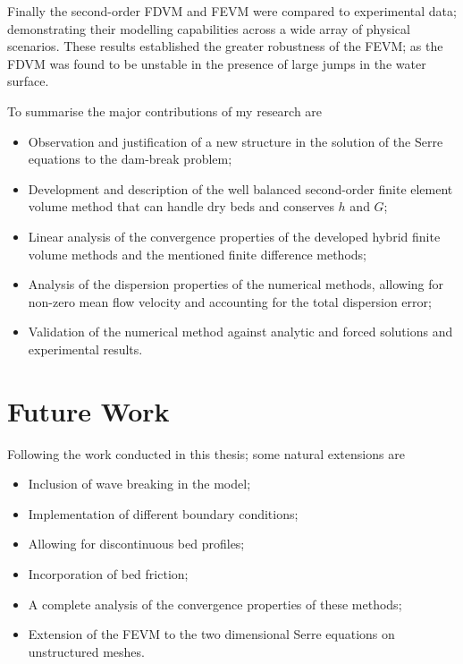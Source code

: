 Finally the second-order FDVM and FEVM  were compared to experimental data; demonstrating their modelling capabilities across a wide array of physical scenarios. These results established the greater robustness of the FEVM; as the FDVM was found to be unstable in the presence of large jumps in the water surface. 

To summarise the major contributions of my research are
\begin{itemize}
	\item Observation and justification of a new structure in the solution of the Serre equations to the dam-break problem;
	\item Development and description of the well balanced second-order finite element volume method that can handle dry beds and conserves $h$ and $G$;
	\item Linear analysis of the convergence properties of the developed hybrid finite volume methods and the mentioned finite difference methods;
	\item Analysis of the dispersion properties of the numerical methods, allowing for non-zero mean flow velocity and accounting for the total dispersion error;
	\item Validation of the numerical method against analytic and forced solutions and experimental results. 
\end{itemize}

\section{Future Work}
Following the work conducted in this thesis; some natural extensions are
\begin{itemize}
	\item Inclusion of wave breaking in the model; 
	\item Implementation of different boundary conditions;
	\item Allowing for discontinuous bed profiles;
	\item Incorporation of bed friction;
	\item A complete analysis of the convergence properties of these methods;
	\item Extension of the FEVM to the two dimensional Serre equations on unstructured meshes.
\end{itemize}





